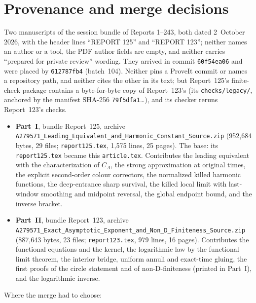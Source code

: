 \documentclass[11pt,letterpaper]{article}
\theoremstyle{remark}\newtheorem{remark}[theorem]{Remark}
\newcommand{\1}{\mathbf1}
\newcommand{\file}[1]{\textup{\nolinkurl{#1}}}
\begin{document}
\section*{Provenance and merge decisions}\label{icw:sec:provenance}
Two manuscripts of the session bundle of Reports 1--243, both dated 2~October 2026, with the header lines ``REPORT 125'' and ``REPORT 123''; neither names an author or a tool, the PDF author fields are empty, and neither carries ``prepared for private review'' wording. They arrived in commit \texttt{60f54ea06} and were placed by \texttt{612787fb4} (batch~104). Neither pins a ProveIt commit or names a repository path, and neither cites the other in its text; but Report~125's finite-check package contains a byte-for-byte copy of Report~123's (its \file{checks/legacy/}, anchored by the manifest SHA-256 \texttt{79f5dfa1}\ldots), and its checker reruns Report~123's checks.
\begin{itemize}
\item \textbf{Part~I}, bundle Report~125, archive \file{A279571_Leading_Equivalent_and_Harmonic_Constant_Source.zip} (952,684 bytes, 29 files; \file{report125.tex}, 1,575 lines, 25 pages). The base: its \file{report125.tex} became this \file{article.tex}. Contributes the leading equivalent with the characterization of $C_A$, the strong approximation at original times, the explicit second-order colour correctors, the normalized killed harmonic functions, the deep-entrance sharp survival, the killed local limit with last-window smoothing and midpoint reversal, the global endpoint bound, and the inverse bracket.
\item \textbf{Part~II}, bundle Report~123, archive \file{A279571_Exact_Asymptotic_Exponent_and_Non_D_Finiteness_Source.zip} (887,643 bytes, 23 files; \file{report123.tex}, 979 lines, 16 pages). Contributes the functional equations and the kernel, the logarithmic law by the functional limit theorem, the interior bridge, uniform annuli and exact-time gluing, the first proofs of the circle statement and of non-D-finiteness (printed in Part~I), and the logarithmic inverse.
\end{itemize}
Where the merge had to choose:
\end{document}
